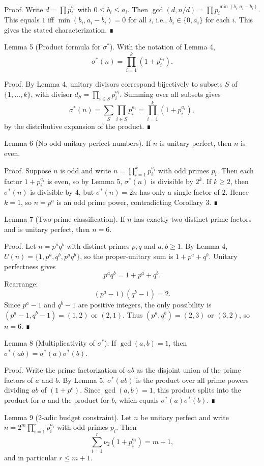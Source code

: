 Proof.
Write $d=\prod p_i^{b_i}$ with $0\le b_i\le a_i$. Then
$\gcd(d,n/d)=\prod p_i^{\min(b_i,a_i-b_i)}$. This equals $1$ iff
$\min(b_i,a_i-b_i)=0$ for all $i$, i.e., $b_i\in\{0,a_i\}$ for each $i$.
This gives the stated characterization. ∎

Lemma 5 (Product formula for $\sigma^*$).
With the notation of Lemma 4,
\[
\sigma^*(n)=\prod_{i=1}^k (1+p_i^{a_i}).
\]

Proof.
By Lemma 4, unitary divisors correspond bijectively to subsets $S$ of $\{1,\dots,k\}$,
with divisor $d_S=\prod_{i\in S} p_i^{a_i}$. Summing over all subsets gives
\[
\sigma^*(n)=\sum_{S} \prod_{i\in S} p_i^{a_i} = \prod_{i=1}^k (1+p_i^{a_i}),
\]
by the distributive expansion of the product. ∎

Lemma 6 (No odd unitary perfect numbers).
If $n$ is unitary perfect, then $n$ is even.

Proof.
Suppose $n$ is odd and write $n=\prod_{i=1}^k p_i^{a_i}$ with odd primes $p_i$.
Then each factor $1+p_i^{a_i}$ is even, so by Lemma 5, $\sigma^*(n)$ is divisible by $2^k$.
If $k\ge 2$, then $\sigma^*(n)$ is divisible by $4$, but $\sigma^*(n)=2n$ has only a single factor of $2$.
Hence $k=1$, so $n=p^a$ is an odd prime power, contradicting Corollary 3. ∎

Lemma 7 (Two-prime classification).
If $n$ has exactly two distinct prime factors and is unitary perfect, then $n=6$.

Proof.
Let $n=p^a q^b$ with distinct primes $p,q$ and $a,b\ge 1$. By Lemma 4,
$U(n)=\{1,p^a,q^b,p^a q^b\}$, so the proper-unitary sum is $1+p^a+q^b$.
Unitary perfectness gives
\[
p^a q^b = 1+p^a+q^b.
\]
Rearrange:
\[(p^a-1)(q^b-1)=2.
\]
Since $p^a-1$ and $q^b-1$ are positive integers, the only possibility is
$(p^a-1,q^b-1)=(1,2)$ or $(2,1)$. Thus $(p^a,q^b)=(2,3)$ or $(3,2)$, so $n=6$. ∎

Lemma 8 (Multiplicativity of $\sigma^*$).
If $\gcd(a,b)=1$, then $\sigma^*(ab)=\sigma^*(a)\sigma^*(b)$.

Proof.
Write the prime factorization of $ab$ as the disjoint union of the prime factors of $a$ and $b$.
By Lemma 5, $\sigma^*(ab)$ is the product over all prime powers dividing $ab$ of $(1+p^e)$.
Since $\gcd(a,b)=1$, this product splits into the product for $a$ and the product for $b$,
which equals $\sigma^*(a)\sigma^*(b)$. ∎

Lemma 9 (2-adic budget constraint).
Let $n$ be unitary perfect and write $n=2^m \prod_{i=1}^r p_i^{a_i}$ with odd primes $p_i$.
Then
\[
\sum_{i=1}^r \nu_2(1+p_i^{a_i}) = m+1,
\]
and in particular $r \le m+1$.

